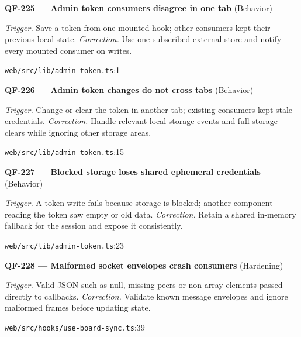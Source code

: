 \begin{minipage}{\linewidth}
\textbf{QF-225 --- Admin token consumers disagree in one tab} {\scriptsize\color{accent}(Behavior)}\par
\textit{Trigger.} Save a token from one mounted hook; other consumers kept their previous local state. \textit{Correction.} Use one subscribed external store and notify every mounted consumer on writes.\par
{\scriptsize\color{muted}\nolinkurl{web/src/lib/admin-token.ts}:1}\par
\end{minipage}\par\vspace{7pt}
\begin{minipage}{\linewidth}
\textbf{QF-226 --- Admin token changes do not cross tabs} {\scriptsize\color{accent}(Behavior)}\par
\textit{Trigger.} Change or clear the token in another tab; existing consumers kept stale credentials. \textit{Correction.} Handle relevant local-storage events and full storage clears while ignoring other storage areas.\par
{\scriptsize\color{muted}\nolinkurl{web/src/lib/admin-token.ts}:15}\par
\end{minipage}\par\vspace{7pt}
\begin{minipage}{\linewidth}
\textbf{QF-227 --- Blocked storage loses shared ephemeral credentials} {\scriptsize\color{accent}(Behavior)}\par
\textit{Trigger.} A token write fails because storage is blocked; another component reading the token saw empty or old data. \textit{Correction.} Retain a shared in-memory fallback for the session and expose it consistently.\par
{\scriptsize\color{muted}\nolinkurl{web/src/lib/admin-token.ts}:23}\par
\end{minipage}\par\vspace{7pt}
\begin{minipage}{\linewidth}
\textbf{QF-228 --- Malformed socket envelopes crash consumers} {\scriptsize\color{accent}(Hardening)}\par
\textit{Trigger.} Valid JSON such as null, missing peers or non-array elements passed directly to callbacks. \textit{Correction.} Validate known message envelopes and ignore malformed frames before updating state.\par
{\scriptsize\color{muted}\nolinkurl{web/src/hooks/use-board-sync.ts}:39}\par
\end{minipage}\par\vspace{7pt}

